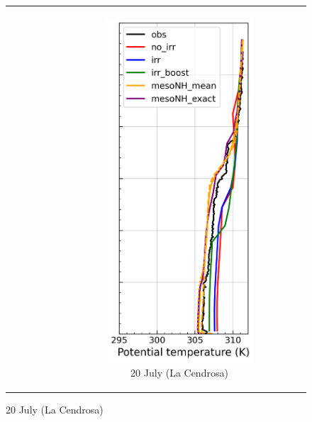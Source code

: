 \begin{figure}[hbtp]
{\begin{tabular}{@{}cccc@{}}
\begin{subfigure}[t]{0.29\textwidth}
        \end{subfigure} &
        \begin{subfigure}[t]{0.285\textwidth}
            \caption{20 July (La Cendrosa)}
            \includegraphics[width=\textwidth]{images/chap5/profiles/profile_cendrosa_theta_2007_sensbins.png}

\end{subfigure}
\end{tabular}}
\end{figure}
